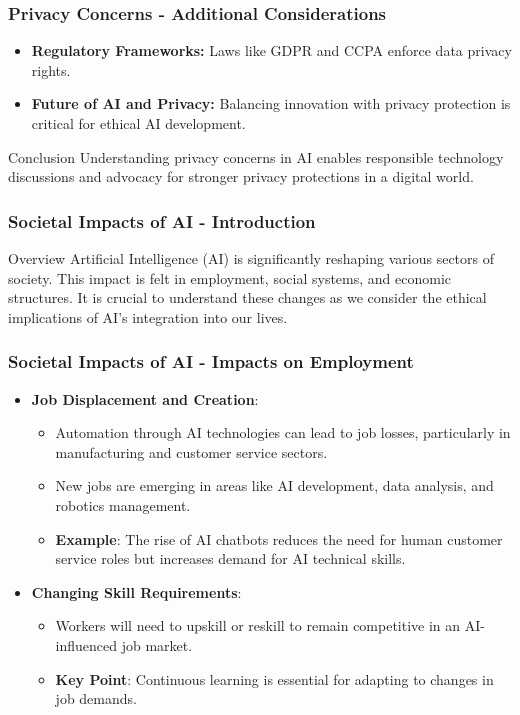 \documentclass[aspectratio=169]{beamer}
\begin{document}
\begin{frame}[fragile]
    \frametitle{Privacy Concerns - Additional Considerations}
    
    \begin{itemize}
        \item \textbf{Regulatory Frameworks:} Laws like GDPR and CCPA enforce data privacy rights.
        \item \textbf{Future of AI and Privacy:} Balancing innovation with privacy protection is critical for ethical AI development.
    \end{itemize}

    \begin{block}{Conclusion}
        Understanding privacy concerns in AI enables responsible technology discussions and advocacy for stronger privacy protections in a digital world.
    \end{block}
\end{frame}

\begin{frame}[fragile]
    \frametitle{Societal Impacts of AI - Introduction}
    \begin{block}{Overview}
        Artificial Intelligence (AI) is significantly reshaping various sectors of society. This impact is felt in employment, social systems, and economic structures. It is crucial to understand these changes as we consider the ethical implications of AI's integration into our lives.
    \end{block}
\end{frame}

\begin{frame}[fragile]
    \frametitle{Societal Impacts of AI - Impacts on Employment}
    \begin{itemize}
        \item \textbf{Job Displacement and Creation}:
            \begin{itemize}
                \item Automation through AI technologies can lead to job losses, particularly in manufacturing and customer service sectors.
                \item New jobs are emerging in areas like AI development, data analysis, and robotics management.
                \item \textbf{Example}: The rise of AI chatbots reduces the need for human customer service roles but increases demand for AI technical skills.
            \end{itemize}
        
        \item \textbf{Changing Skill Requirements}:
            \begin{itemize}
                \item Workers will need to upskill or reskill to remain competitive in an AI-influenced job market.
                \item \textbf{Key Point}: Continuous learning is essential for adapting to changes in job demands.
            \end{itemize}
    \end{itemize}
\end{frame}
\end{document}

